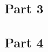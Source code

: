 \documentclass{article}
\begin{document}


        \subsection{Part 3}




        \subsection{Part 4}

\end{document}

